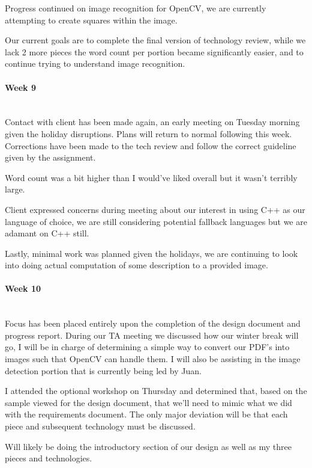 \documentclass[article, onecolumn, draftclsnofoot,10pt, compsoc]{IEEEtran}
\begin{document}
Progress continued on image recognition for OpenCV, we are currently attempting to create squares within the image.  
 
Our current goals are to complete the final version of technology review, while we lack 2 more pieces the word count per portion became significantly easier, and to continue trying to understand image recognition.


\paragraph{Week 9}
\mbox{}\\
Contact with client has been made again, an early meeting on Tuesday morning given the holiday disruptions. Plans will return to normal following this week. Corrections have been made to the tech review and follow the correct guideline given by the assignment.
 
Word count was a bit higher than I would've liked overall but it wasn't terribly large.
 
Client expressed concerns during meeting about our interest in using C++ as our language of choice, we are still considering potential fallback languages but we are adamant on C++ still.
 
Lastly, minimal work was planned given the holidays, we are continuing to look into doing actual computation of some description to a provided image.


\paragraph{Week 10}
\mbox{}\\
Focus has been placed entirely upon the completion of the design document and progress report. During our TA meeting we discussed how our winter break will go, I will be in charge of determining a simple way to convert our PDF's into images such that OpenCV can handle them. I will also be assisting in the image detection portion that is currently being led by Juan. 

I attended the optional workshop on Thursday and determined that, based on the sample viewed for the design document, that we'll need to mimic what we did with the requirements document. The only major deviation will be that each piece and subsequent technology must be discussed.

Will likely be doing the introductory section of our design as well as my three pieces and technologies.
\end{document}
